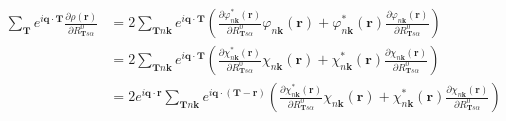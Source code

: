 \documentclass{article}
\begin{document}
\begin{align}
    \sum_{\textbf{T}}
    e^{i\textbf{q}\cdot\textbf{T}}\frac{\partial \rho(\textbf{r})}{\partial R^0_{\textbf{T}s\alpha}}
    &=
    2 \sum_{\textbf{T}n\textbf{k}}e^{i\textbf{q}\cdot\textbf{T}} 
    \left( 
        \frac{\partial \varphi_{n\textbf{k}}^*(\textbf{r})}{\partial R^0_{\textbf{T}s\alpha}}\varphi_{n\textbf{k}}(\textbf{r})
       +\varphi_{n\textbf{k}}^*(\textbf{r})\frac{\partial \varphi_{n\textbf{k}}(\textbf{r})}{\partial R^0_{\textbf{T}s\alpha}}
    \right)
    \nonumber \\
    &=
    2 \sum_{\textbf{T}n\textbf{k}}e^{i\textbf{q}\cdot\textbf{T}} 
    \left( 
        \frac{\partial \chi_{n\textbf{k}}^*(\textbf{r})}{\partial R^0_{\textbf{T}s\alpha}}\chi_{n\textbf{k}}(\textbf{r})
       +\chi_{n\textbf{k}}^*(\textbf{r})\frac{\partial \chi_{n\textbf{k}}(\textbf{r})}{\partial R^0_{\textbf{T}s\alpha}}
    \right)
    \nonumber \\
    &=
    2 e^{i\textbf{q}\cdot\textbf{r}}\sum_{\textbf{T}n\textbf{k}}e^{i\textbf{q}\cdot(\textbf{T}-\textbf{r})} 
    \left( 
        \frac{\partial \chi_{n\textbf{k}}^*(\textbf{r})}{\partial R^0_{\textbf{T}s\alpha}}\chi_{n\textbf{k}}(\textbf{r})
       +\chi_{n\textbf{k}}^*(\textbf{r})\frac{\partial \chi_{n\textbf{k}}(\textbf{r})}{\partial R^0_{\textbf{T}s\alpha}}
    \right)
\end{align}
\end{document}
